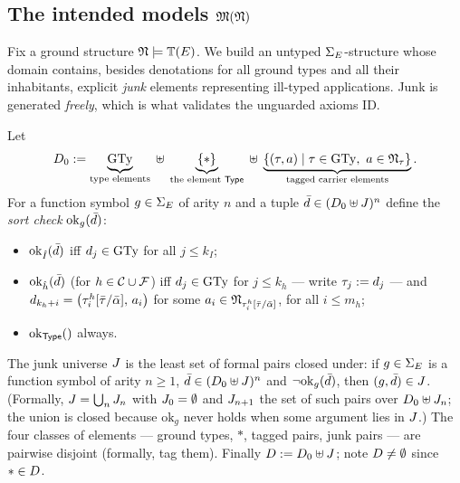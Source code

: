 \subsection{The intended models \texorpdfstring{$\mathfrak{M}(\mathfrak{N})$}{M(N)}}
\label{subsec:intended}

Fix a ground structure $\mathfrak{N} \models \mathbb{T}(E)$.  We build an untyped
$\Sigma_{E}$-structure whose domain contains, besides denotations for all ground
types and all their inhabitants, explicit \emph{junk} elements representing
ill-typed applications.  Junk is generated \emph{freely}, which is what
validates the unguarded axioms $\mathrm{ID}$.

\begin{definition}[Domain]
  \label{def:domain}
  Let
  \[
    D_0 \mathrel{:=}
    \underbrace{\mathrm{GTy}}_{\text{type elements}} \;\uplus\;
    \underbrace{\{\ast\}}_{\text{the element } \mathsf{Type}} \;\uplus\;
    \underbrace{\{(\tau, a) \mid \tau \in \mathrm{GTy},\ a \in \mathfrak{N}_\tau\}}_{
      \text{tagged carrier elements}} .
  \]
  For a function symbol $g \in \Sigma_{E}$ of arity $n$ and a tuple
  $\bar{d} \in (D_0 \uplus J)^n$ define the \emph{sort check}
  $\mathrm{ok}_g(\bar{d})$:
  \begin{itemize}
  \item $\mathrm{ok}_{\hat I}(\bar{d})$ iff $d_j \in \mathrm{GTy}$ for all
    $j \le k_I$;
  \item $\mathrm{ok}_{\hat h}(\bar{d})$ (for $h \in \mathcal{C} \cup \mathcal{F}$) iff
    $d_j \in \mathrm{GTy}$ for $j \le k_h$ --- write $\tau_j \mathrel{:=} d_j$ --- and
    $d_{k_h+i} = \bigl(\tau^h_i[\bar{\tau}/\bar{\alpha}],\, a_i\bigr)$ for some
    $a_i \in \mathfrak{N}_{\tau^h_i[\bar{\tau}/\bar{\alpha}]}$, for all $i \le m_h$;
  \item $\mathrm{ok}_{\mathsf{Type}}() $ always.
  \end{itemize}
  The junk universe $J$ is the least set of formal pairs closed under:
  if $g \in \Sigma_{E}$ is a function symbol of arity $n \ge 1$,
  $\bar{d} \in (D_0 \uplus J)^n$ and $\neg\mathrm{ok}_g(\bar{d})$,
  then $(g, \bar{d}) \in J$.  (Formally,
  $J = \bigcup_n J_n$ with $J_0 = \emptyset$ and
  $J_{n+1}$ the set of such pairs over $D_0 \uplus J_n$; the
  union is closed because $\mathrm{ok}_g$ never holds when some argument
  lies in $J$.)  The four classes of elements --- ground types, $\ast$,
  tagged pairs, junk pairs --- are pairwise disjoint (formally, tag them).
  Finally $D \mathrel{:=} D_0 \uplus J$; note $D \neq \emptyset$
  since $\ast \in D$.
\end{definition}

